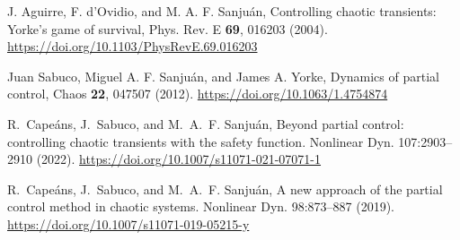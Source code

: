\begin{thebibliography}{01}
J. Aguirre, F. d’Ovidio, and M. A. F. Sanjuán,
Controlling chaotic transients: Yorke’s game of survival,
Phys. Rev. E \textbf{69}, 016203
(2004).
\url{https://doi.org/10.1103/PhysRevE.69.016203}

Juan Sabuco, Miguel A. F. Sanjuán,  and James A. Yorke,
Dynamics of partial control,
Chaos \textbf{22}, 047507
(2012).
\url{https://doi.org/10.1063/1.4754874}

R.~Cape{\'a}ns, J.~Sabuco, and M.~A.~F. Sanju{\'a}n, 
Beyond partial control: controlling chaotic transients
with the safety function.
Nonlinear Dyn. 107:2903–2910
(2022).
\url{https://doi.org/10.1007/s11071-021-07071-1}

R.~Cape{\'a}ns, J.~Sabuco, and M.~A.~F. Sanju{\'a}n, 
A new approach of the partial control method in chaotic systems.
Nonlinear Dyn. 98:873--887
(2019).
\url{https://doi.org/10.1007/s11071-019-05215-y}








\end{thebibliography}

